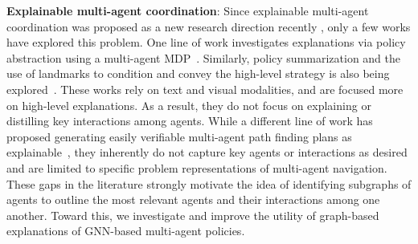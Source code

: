 

\textbf{Explainable multi-agent coordination}:
Since explainable multi-agent coordination was proposed as a new research direction recently \cite{kraus2020ai}, only a few works have explored this problem. 
One line of work investigates explanations via policy abstraction using a multi-agent MDP~\cite{boggess2022toward, boggess2023explainable}. Similarly, policy summarization and the use of landmarks to condition and convey the high-level strategy is also being explored~\cite{pandya2024multi}. These works rely on text and visual modalities, and are focused more on high-level explanations. As a result, they do not focus on explaining or distilling key interactions among agents.
While a different line of work has proposed generating easily verifiable multi-agent path finding plans as explainable~\cite{almagor2020explainable, kottinger2022conflict, kottingerexplainable}, they inherently do not capture key agents or interactions as desired and are limited to specific problem representations of multi-agent navigation. These gaps in the literature strongly motivate the idea of identifying subgraphs of agents to outline the most relevant agents and their interactions among one another. Toward this, we investigate and improve the utility of graph-based explanations of GNN-based multi-agent policies.

